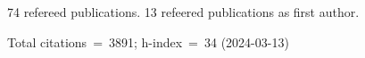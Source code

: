 74 refereed publications. 13 refeered publications as first author.

Total citations~=~3891; h-index~=~34 (2024-03-13)